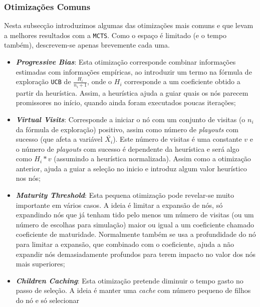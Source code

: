 \documentclass[12pt,a4paper,oneside]{article}
\begin{document}
\subsubsection{Otimizações Comuns}
\label{sec:mcopt}


Nesta subsecção introduzimos algumas das otimizações mais comuns e que
levam a melhores resultados com a \texttt{MCTS}. Como o espaço é
limitado (e o tempo também), descrevem-se apenas brevemente cada uma.

\begin{itemize}
\item \textbf{\textit{Progressive Bias}}: Esta otimização corresponde
  combinar informações estimadas com informações empíricas, ao
  introduzir um termo na fórmula de exploração \texttt{UCB} de
  $\frac{H_i}{n_i + 1}$, onde o $H_i$ corresponde a um coeficiente
  obtido a partir da heurística. Assim, a heurística ajuda a guiar
  quais os nós parecem promissores no início, quando ainda foram
  executados poucas iterações;
\item \textbf{\textit{Virtual Visits}}: Corresponde a iniciar o nó com
  um conjunto de visitas (o $n_i$ da fórmula de exploração) positivo,
  assim como número de \textit{playouts} com sucesso (que afeta a
  variável $\bar{X_i}$). Este número de visitas é uma constante $v$ e
  o número de \textit{playouts} com sucesso é dependente da heurística
  e será algo como $H_i * v$ (assumindo a heurística
  normalizada). Assim como a otimização anterior, ajuda a guiar a
  seleção no inicio e introduz algum valor heurístico nos nós;
\item \textbf{\textit{Maturity Threshold}}: Esta pequena otimização
  pode revelar-se muito importante em vários casos. A ideia é limitar
  a expansão de nós, só expandindo nós que já tenham tido pelo menos
  um número de visitas (ou um número de escolhas para simulação) maior
  ou igual a um coeficiente chamado coeficiente de
  maturidade. Normalmente também se usa a profundidade do nó para
  limitar a expansão, que combinado com o coeficiente, ajuda a não
  expandir nós demasiadamente profundos para terem impacto no valor
  dos nós mais superiores;
\item \textbf{\textit{Children Caching}}: Esta otimização pretende
  diminuir o tempo gasto no passo de seleção. A ideia é manter uma
  \textit{cache} com número pequeno de filhos do nó e só selecionar

\end{itemize}
\end{document}
